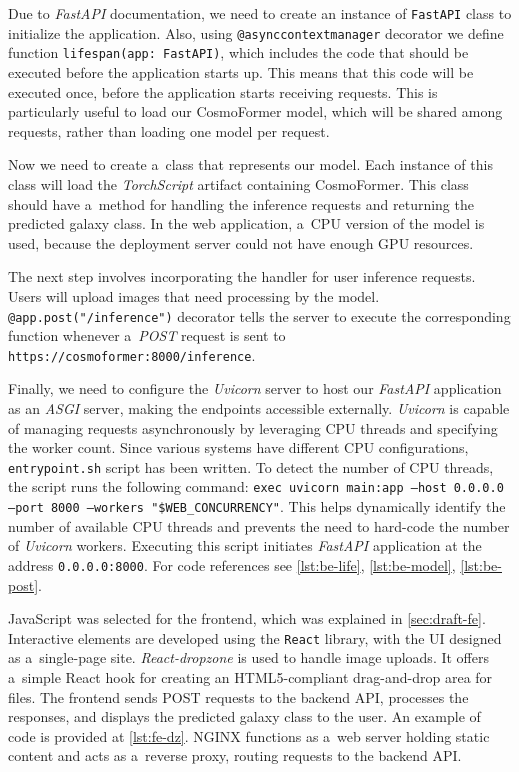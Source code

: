 Due to \textit{FastAPI} documentation, we need to create an instance of \texttt{FastAPI} class to initialize the application. Also, using \texttt{@asynccontextmanager} decorator we define function \texttt{lifespan(app: FastAPI)}, which includes the code that should be executed before the application starts up. This means that this code will be executed once, before the application starts receiving requests. This is particularly useful to load our CosmoFormer model, which will be shared among requests, rather than loading one model per request.

Now we need to create a~class that represents our model. Each instance of this class will load the \textit{TorchScript} artifact containing CosmoFormer. This class should have a~method for handling the inference requests and returning the predicted galaxy class. In the web application, a~CPU version of the model is used, because the deployment server could not have enough GPU resources. 

The next step involves incorporating the handler for user inference requests. Users will upload images that need processing by the model. \texttt{@app.post("/inference")} decorator tells the server to execute the corresponding function whenever a~\textit{POST} request is sent to \texttt{https://cosmoformer:8000/inference}. 

Finally, we need to configure the \textit{Uvicorn} server to host our \textit{FastAPI} application as an \textit{ASGI} server, making the endpoints accessible externally. \textit{Uvicorn} is capable of managing requests asynchronously by leveraging CPU threads and specifying the worker count. Since various systems have different CPU configurations, \texttt{entrypoint.sh} script has been written. To detect the number of CPU threads, the script runs the following command: \texttt{exec uvicorn main:app --host 0.0.0.0 --port 8000 --workers "\$WEB\_CONCURRENCY"}. This helps dynamically identify the number of available CPU threads and prevents the need to hard-code the number of \textit{Uvicorn} workers. Executing this script initiates \textit{FastAPI} application at the address \texttt{0.0.0.0:8000}. For code references see \autoref{lst:be-life}, \autoref{lst:be-model}, \autoref{lst:be-post}.

JavaScript was selected for the frontend, which was explained in \autoref{sec:draft-fe}. Interactive elements are developed using the \texttt{React} library, with the UI designed as a~single-page site. \textit{React-dropzone} is used to handle image uploads. It offers a~simple React hook for creating an HTML5-compliant drag-and-drop area for files. The frontend sends POST requests to the backend API, processes the responses, and displays the predicted galaxy class to the user. An example of code is provided at \autoref{lst:fe-dz}. NGINX functions as a~web server holding static content and acts as a~reverse proxy, routing requests to the backend API.

